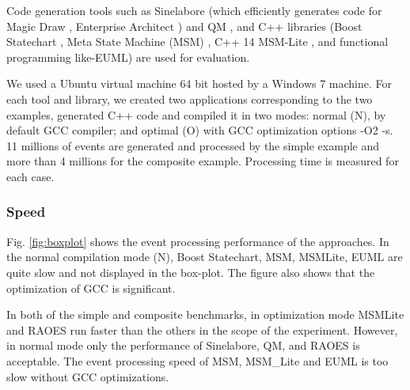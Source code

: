 Code generation tools such as Sinelabore (which efficiently generates code for Magic Draw \cite{Magicdraw}, Enterprise Architect \cite{EA}) and QM \cite{qm}
, and C++ libraries (Boost Statechart \cite{Statechart}, Meta State Machine (MSM) \cite{MSM}, C++ 14 MSM-Lite \cite{benchmark}, and functional programming like-EUML\cite{EUML}) are used for evaluation. 

We used a Ubuntu virtual machine 64 bit hosted by a Windows 7 machine. 
For each tool and library, we created two applications corresponding to the two examples, generated C++ code and compiled it in two modes: normal (N), by default GCC compiler; and optimal (O) with GCC optimization options -O2 -s. 
11 millions of events are generated and processed by the simple example and more than 4 millions for the composite example. 
Processing time is measured for each case. 

\subsubsection{Speed} 
Fig. \ref{fig:boxplot} shows the event processing performance of the approaches.
In the normal compilation mode (N), Boost Statechart, MSM, MSMLite, EUML are quite slow and not displayed in the box-plot. 
The figure also shows that the optimization of GCC is significant.  

In both of the simple and composite benchmarks, in optimization mode MSMLite and RAOES run faster than the others in the scope of the experiment.
However, in normal mode only the performance of Sinelabore, QM, and RAOES is acceptable. 
The event processing speed of MSM, MSM\_Lite and EUML is too slow without GCC optimizations. 


